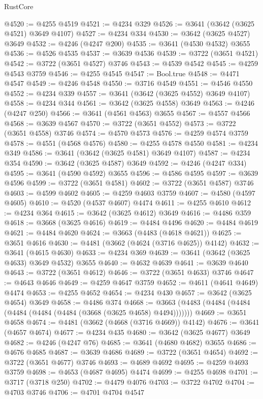 \begin{lexlean}{RustCore}
\begin{coremodule}
@4520 := @4255 @4519
@4521 := @4234 @329
@4526 := @3641 (@3642 (@3625 @4521) @3649 @4107)
@4527 := @4234 @334
@4530 := @3642 (@3625 @4527) @3649
@4532 := @4246 (@4247 @200)
@4535 := @3641 (@4530 @4532) @3655
@4536 := @4526 @4535
@4537 := @3639 @4536
@4539 := @3722 (@3651 @4521)
@4542 := @3722 (@3651 @4527) @3746
@4543 := @4539 @4542
@4545 := @4259 @4543 @3759
@4546 := @4255 @4545
@4547 := Bool.true
@4548 := @4471 @4547
@4549 := @4246 @4548
@4550 := @3716 @4549
@4551 := @4546 @4550
@4552 := @4234 @339
@4557 := @3641 (@3642 (@3625 @4552) @3649 @4107)
@4558 := @4234 @344
@4561 := @3642 (@3625 @4558) @3649
@4563 := @4246 (@4247 @250)
@4566 := @3641 (@4561 @4563) @3655
@4567 := @4557 @4566
@4568 := @3639 @4567
@4570 := @3722 (@3651 @4552)
@4573 := @3722 (@3651 @4558) @3746
@4574 := @4570 @4573
@4576 := @4259 @4574 @3759
@4578 := @4551 (@4568 @4576)
@4580 := @4255 @4578 @4550
@4581 := @4234 @349
@4586 := @3641 (@3642 (@3625 @4581) @3649 @4107)
@4587 := @4234 @354
@4590 := @3642 (@3625 @4587) @3649
@4592 := @4246 (@4247 @334)
@4595 := @3641 (@4590 @4592) @3655
@4596 := @4586 @4595
@4597 := @3639 @4596
@4599 := @3722 (@3651 @4581)
@4602 := @3722 (@3651 @4587) @3746
@4603 := @4599 @4602
@4605 := @4259 @4603 @3759
@4607 := @4580 (@4597 @4605)
@4610 := @4520 (@4537 @4607) @4474
@4611 := @4255 @4610
@4612 := @4234 @364
@4615 := @3642 (@3625 @4612) @3649
@4616 := @4486 @359
@4618 := @3668 (@3625 @4616)
@4619 := @4484 @4496
@4620 := @4484 @4619
@4621 := @4484 @4620
@4624 := @3663 (@4483 (@4618 @4621))
@4625 := @3651 @4616
@4630 := @4481 (@3662 (@4624 (@3716 @4625)) @4142)
@4632 := @3641 (@4615 @4630)
@4633 := @4234 @369
@4639 := @3641 (@3642 (@3625 @4633) @3649 @4532) @3655
@4640 := @4632 @4639
@4641 := @3639 @4640
@4643 := @3722 (@3651 @4612)
@4646 := @3722 (@3651 @4633) @3746
@4647 := @4643 @4646
@4649 := @4259 @4647 @3759
@4652 := @4611 (@4641 @4649) @4474
@4653 := @4255 @4652
@4654 := @4234 @430
@4657 := @3642 (@3625 @4654) @3649
@4658 := @4486 @374
@4668 := @3663 (@4483 (@4484 (@4484 (@4484 (@4484 (@4484 (@3668 (@3625 @4658) @4494)))))))
@4669 := @3651 @4658
@4674 := @4481 (@3662 (@4668 (@3716 @4669)) @4142)
@4676 := @3641 (@4657 @4674)
@4677 := @4234 @435
@4680 := @3642 (@3625 @4677) @3649
@4682 := @4246 (@4247 @76)
@4685 := @3641 (@4680 @4682) @3655
@4686 := @4676 @4685
@4687 := @3639 @4686
@4689 := @3722 (@3651 @4654)
@4692 := @3722 (@3651 @4677) @3746
@4693 := @4689 @4692
@4695 := @4259 @4693 @3759
@4698 := @4653 (@4687 @4695) @4474
@4699 := @4255 @4698
@4701 := @3717 (@3718 @250)
@4702 := @4479 @4076
@4703 := @3722 @4702
@4704 := @4703 @3746
@4706 := @4701 @4704 @4547

\end{coremodule}
\end{lexlean}
